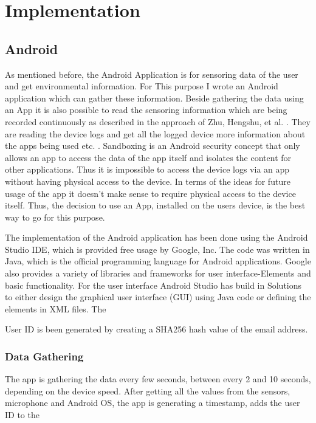 \chapter{Implementation}

\begin{flushleft}

\end{flushleft}

\section{Android}
As mentioned before, the Android Application is for sensoring data of the user and get environmental information. For This purpose I wrote an Android application which can gather these information. 
Beside gathering the data using an App it is also possible to read the sensoring information which are being recorded continuously as described in the approach of
Zhu, Hengshu, et al. \cite{zhu2015mining}. They are reading the device logs and get all the logged device more information about the apps being used etc. .
Sandboxing is an Android security concept that only allows an app to access the data of the app itself and isolates the content for other applications. Thus it is impossible to access the device logs via an app without having physical access to the device. 
In terms of the ideas for future usage of the app it doesn't make sense to require physical access to the device itself. Thus, the decision to use an App, installed on the users device, is the best way to go for this purpose.

The implementation of the Android application has been done using the Android Studio IDE, which is provided free usage by Google, Inc. The code was written in Java, which is the official programming language for Android applications. Google also provides a variety of libraries and frameworks for user interface-Elements and basic functionality. For the user interface Android Studio has build in Solutions to either design the graphical user interface (GUI) using Java code or defining the elements in XML files. 
The  


User ID is been generated by creating a SHA256 hash value of the email address. 

\subsection{Data Gathering}
The app is gathering the data every few seconds, between every 2 and 10 seconds, depending on the device speed. After getting all the values from the sensors, microphone and Android OS, the app is generating a timestamp, adds the user ID to the 



